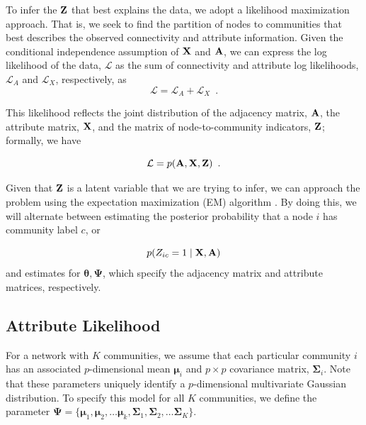 To infer the ${\bf Z}$ that best explains the data, we adopt a likelihood maximization approach. That is, we seek to find the partition of nodes to communities that best describes the observed connectivity and attribute information.  Given the conditional independence assumption of ${\bf X}$ and ${\bf A}$, we can express the log likelihood of the data, ${\mathcal L}$ as the sum of connectivity and attribute log likelihoods, ${\mathcal L}_{A}$ and ${\mathcal L}_{X}$, respectively,
as
\begin{equation}
\mathcal{L}=\mathcal{L}_{A}+\mathcal{L}_{X}\enspace.
\label{eqn:likelihood_decomposition}
\end{equation}

This likelihood reflects the joint distribution of the adjacency matrix, ${\bf A}$, the attribute matrix, ${\bf X}$, and the matrix of node-to-community indicators, ${\bf Z}$; formally, we have 

\begin{equation}
\mathcal{L}=p({\bf A},{\bf X},{\bf Z})\enspace. 
\end{equation}

Given that ${\bf Z}$ is a latent variable that we are trying to infer, we can approach the problem using the expectation maximization (EM) algorithm \cite{EM}. By doing this, we will alternate between estimating the posterior probability that a node $i$ has community label $c$, or

\begin{equation}
\label{post}
p(Z_{ic}=1\mid {\bf X,A})
\end{equation} 
and estimates for ${\boldsymbol \theta, \boldsymbol \Psi}$, which specify the adjacency matrix and attribute matrices, respectively. 

\subsection{Attribute Likelihood}

For a network with $K$ communities, we assume that each particular community $i$ has an associated $p$-dimensional mean ${\boldsymbol \mu}_{i}$ and $p \times p$ covariance matrix, ${\boldsymbol \Sigma}_{i}$. Note that these parameters uniquely identify a $p$-dimensional multivariate Gaussian distribution. To specify this model for all $K$ communities, we define the parameter ${\boldsymbol \Psi}=\{{\boldsymbol \mu}_{1},{\boldsymbol \mu}_{2},\dots {\boldsymbol \mu}_{k},{\boldsymbol \Sigma}_{1},{\boldsymbol \Sigma}_{2},\dots {\boldsymbol \Sigma}_{K}\}$. 

